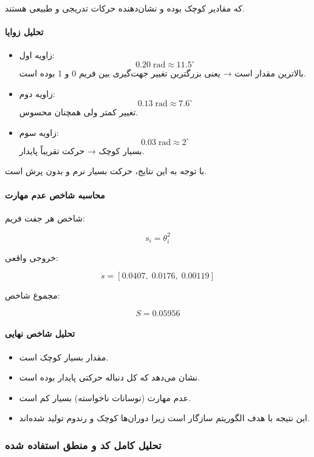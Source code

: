 \documentclass{article}
\begin{document}
که مقادیر کوچک بوده و نشان‌دهنده حرکات تدریجی و طبیعی هستند.

\paragraph{تحلیل زوایا}

\begin{itemize}
	\item زاویه اول:  
	\[
	0.20 \; \text{rad} \approx 11.5^\circ
	\]
	بالاترین مقدار است → یعنی بزرگترین تغییر جهت‌گیری بین فریم 0 و 1 بوده است.
	
	\item زاویه دوم:  
	\[
	0.13 \; \text{rad} \approx 7.6^\circ
	\]
	تغییر کمتر ولی همچنان محسوس.
	
	\item زاویه سوم:  
	\[
	0.03 \; \text{rad} \approx 2^\circ
	\]
	بسیار کوچک → حرکت تقریباً پایدار.
\end{itemize}

با توجه به این نتایج، حرکت بسیار نرم و بدون پرش است.

\paragraph{محاسبه شاخص عدم مهارت}

شاخص هر جفت فریم:

\[
s_i = \theta_i^2
\]

خروجی واقعی:

\[
s = [0.0407,\; 0.0176,\; 0.00119]
\]

مجموع شاخص:

\[
S = 0.05956
\]

\paragraph{تحلیل شاخص نهایی}

\begin{itemize}
	\item مقدار بسیار کوچک است.
	\item نشان می‌دهد که کل دنباله حرکتی پایدار بوده است.
	\item عدم مهارت (نوسانات ناخواسته) بسیار کم است.
	\item این نتیجه با هدف الگوریتم سازگار است زیرا دوران‌ها کوچک و رندوم تولید شده‌اند.
\end{itemize}


\subsubsection{تحلیل کامل کد و منطق استفاده شده}
\end{document}
